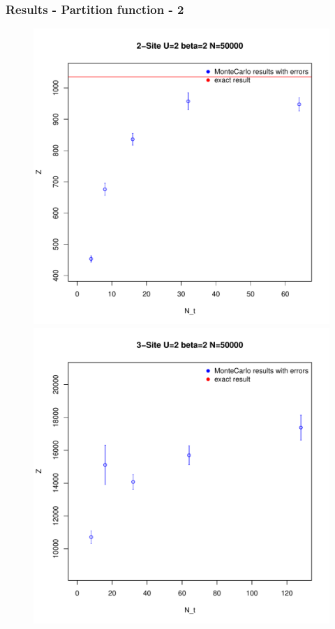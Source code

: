 \documentclass{beamer}
\begin{document}
\begin{frame}
	\frametitle{Results - Partition function - 2}
	\begin{figure}
		\centering
		\begin{minipage}{.5\textwidth}
			\centering
			\includegraphics[width=1\linewidth]{figs/plot_Z2Nt}
		\end{minipage}%
		\begin{minipage}{.5\textwidth}
			\centering
			\includegraphics[width=1\linewidth]{figs/plot_Z3Nt}
		\end{minipage}
	\end{figure}
		
\end{frame}
\end{document}
